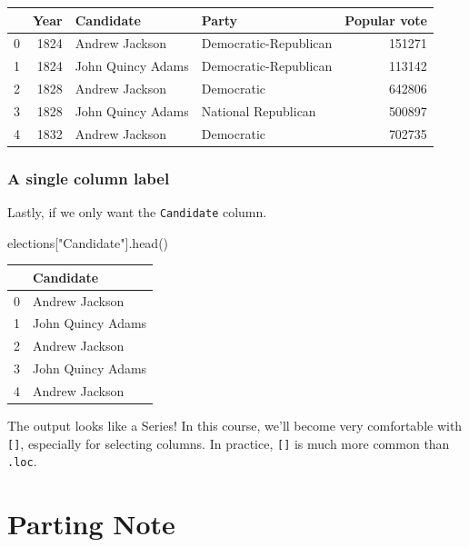\documentclass[
  letterpaper,
  DIV=11,
  numbers=noendperiod]{scrreprt}
\newenvironment{Shaded}{\begin{snugshade}}{\end{snugshade}}
\newcommand{\NormalTok}[1]{\textcolor[rgb]{0.00,0.23,0.31}{#1}}
\newcommand{\StringTok}[1]{\textcolor[rgb]{0.13,0.47,0.30}{#1}}
\begin{document}
\begin{tabular}{lrllr}
\toprule
{} &  Year &          Candidate &                  Party &  Popular vote \\
\midrule
0 &  1824 &     Andrew Jackson &  Democratic-Republican &        151271 \\
1 &  1824 &  John Quincy Adams &  Democratic-Republican &        113142 \\
2 &  1828 &     Andrew Jackson &             Democratic &        642806 \\
3 &  1828 &  John Quincy Adams &    National Republican &        500897 \\
4 &  1832 &     Andrew Jackson &             Democratic &        702735 \\
\bottomrule
\end{tabular}

\hypertarget{a-single-column-label}{%
\subsubsection{A single column label}\label{a-single-column-label}}

Lastly, if we only want the \texttt{Candidate} column.

\begin{Shaded}
\begin{Highlighting}[]
\NormalTok{elections[}\StringTok{"Candidate"}\NormalTok{].head()}
\end{Highlighting}
\end{Shaded}

\begin{tabular}{ll}
\toprule
{} &          Candidate \\
\midrule
0 &     Andrew Jackson \\
1 &  John Quincy Adams \\
2 &     Andrew Jackson \\
3 &  John Quincy Adams \\
4 &     Andrew Jackson \\
\bottomrule
\end{tabular}

The output looks like a Series! In this course, we'll become very
comfortable with \texttt{{[}{]}}, especially for selecting columns. In
practice, \texttt{{[}{]}} is much more common than \texttt{.loc}.

\hypertarget{parting-note}{%
\section{Parting Note}\label{parting-note}}
\end{document}
